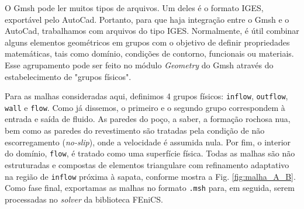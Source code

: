 O Gmsh pode ler muitos tipos de arquivos. Um deles é o formato IGES, exportável pelo AutoCad. Portanto, para que haja integração entre o Gmsh e o AutoCad, trabalhamos com arquivos do tipo IGES. Normalmente, é útil combinar alguns elementos geométricos em grupos com o objetivo de definir propriedades matemáticas, tais como domínio, condições de contorno, funcionais ou materiais. Esse agrupamento pode ser feito no módulo \textit{Geometry} do Gmsh através do estabelecimento de "grupos físicos".

Para as malhas consideradas aqui, definimos 4 grupos físicos: \texttt{inflow}, \texttt{outflow}, \texttt{wall} e \texttt{flow}. Como já dissemos, o primeiro e o segundo grupo correspondem à entrada e saída de fluido. As paredes do poço, a saber, a formação rochosa nua, bem como as paredes do revestimento são tratadas pela condição de não escorregamento (\textit{no-slip}), onde a velocidade é assumida nula. Por fim, o interior do domínio, \texttt{flow}, é tratado como uma superfície física. Todas as malhas são não estruturadas e compostas de elementos triangulare com refinamento adaptativo na região de \texttt{inflow} próxima à sapata, conforme mostra a Fig. \ref{fig:malha_A_B}. Como fase final, exportamas as malhas no formato \texttt{.msh} para, em seguida, serem processadas no \textit{solver} da biblioteca FEniCS. 


